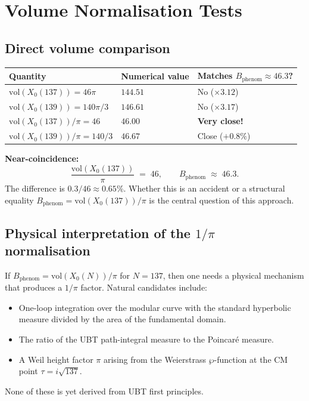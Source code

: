 \documentclass[12pt,a4paper]{article}
\theoremstyle{definition}
\theoremstyle{remark}
\begin{document}
\section{Volume Normalisation Tests}
\label{sec:volume_test}

\subsection{Direct volume comparison}

\begin{center}
\begin{tabular}{lll}
  \toprule
  Quantity & Numerical value & Matches $B_{\mathrm{phenom}} \approx 46.3$? \\
  \midrule
  $\mathrm{vol}(X_0(137)) = 46\pi$ & $144.51$ & No ($\times 3.12$) \\
  $\mathrm{vol}(X_0(139)) = 140\pi/3$ & $146.61$ & No ($\times 3.17$) \\
  $\mathrm{vol}(X_0(137))/\pi = 46$ & $46.00$ & \textbf{Very close!} \\
  $\mathrm{vol}(X_0(139))/\pi = 140/3$ & $46.67$ & Close ($+0.8\%$) \\
  \bottomrule
\end{tabular}
\end{center}

\begin{insightbox}
\textbf{Near-coincidence:}
\[
  \frac{\mathrm{vol}(X_0(137))}{\pi} \;=\; 46 ,
  \qquad
  B_{\mathrm{phenom}} \;\approx\; 46.3.
\]
The difference is $0.3/46 \approx 0.65\%$.  Whether this is an accident or a
structural equality $B_{\mathrm{phenom}} = \mathrm{vol}(X_0(137))/\pi$ is the
central question of this approach.
\end{insightbox}

\subsection{Physical interpretation of the $1/\pi$ normalisation}

If $B_{\mathrm{phenom}} = \mathrm{vol}(X_0(N))/\pi$ for $N = 137$, then one
needs a physical mechanism that produces a $1/\pi$ factor.  Natural candidates
include:
\begin{itemize}
  \item One-loop integration over the modular curve with the standard
        hyperbolic measure divided by the area of the fundamental domain.
  \item The ratio of the UBT path-integral measure to the Poincar\'{e} measure.
  \item A Weil height factor $\pi$ arising from the Weierstrass $\wp$-function
        at the CM point $\tau = i\sqrt{137}$.
\end{itemize}
None of these is yet derived from UBT first principles.
\end{document}
